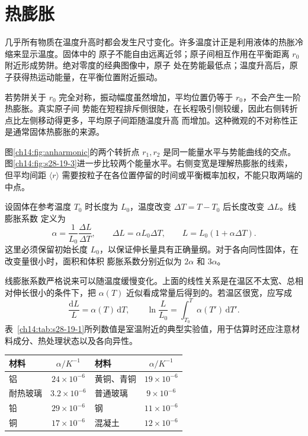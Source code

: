 {\section{热膨胀}\label{ch14:sec:expansion}

几乎所有物质在温度升高时都会发生尺寸变化。许多温度计正是利用液体的热胀冷缩来显示温度。固体中的
原子不能自由远离近邻；原子间相互作用在平衡距离 $r_0$ 附近形成势阱。绝对零度的经典图像中，原子
处在势能最低点；温度升高后，原子获得热运动能量，在平衡位置附近振动。

若势阱关于 $r_0$ 完全对称，振动幅度虽然增加，平均位置仍等于 $r_0$，不会产生一阶热膨胀。真实原子间
势能在短程排斥侧很陡，在长程吸引侧较缓，因此右侧转折点比左侧移动得更多，平均原子间距随温度升高
而增加。这种微观的不对称性正是通常固体热膨胀的来源。

图\ref{ch14:fig:anharmonic}的两个转折点 $r_1,r_2$ 是同一能量水平与势能曲线的交点。
图\ref{ch14:fig:s28-19-3}进一步比较两个能量水平。右侧变宽是理解热膨胀的线索，
但平均间距 $\langle r\rangle$ 需要按粒子在各位置停留的时间或平衡概率加权，不能只取两端的中点。
\anharmonicPotentialDiagram

\figureNineteenThreeFaithful

设固体在参考温度 $T_0$ 时长度为 $L_0$，温度改变 $\Delta T=T-T_0$ 后长度改变 $\Delta L$。线膨胀系数
定义为
\begin{equation}
  \boxed{\alpha=\frac{1}{L_0}\frac{\Delta L}{\Delta T}},
  \qquad
  \boxed{\Delta L=\alpha L_0\Delta T},
  \qquad
  \boxed{L=L_0(1+\alpha\Delta T)}.
\end{equation}
这里必须保留初始长度 $L_0$，以保证伸长量具有正确量纲。对于各向同性固体，在改变量很小时，面积和体积
膨胀系数分别近似为 $2\alpha$ 和 $3\alpha$。

线膨胀系数严格说来可以随温度缓慢变化。上面的线性关系是在温区不太宽、总相对伸长很小的条件下，把
$\alpha(T)$ 近似看成常量后得到的。若温区很宽，应写成
\begin{equation}
  \frac{\mathrm dL}{L}=\alpha(T)\,\mathrm dT,
  \qquad
  \ln\frac{L}{L_0}=\int_{T_0}^{T}\alpha(T')\,\mathrm dT'.
\end{equation}
表~\ref{ch14:tab:s28-19-1}所列数值是室温附近的典型实验值，用于估算时还应注意材料成分、热处理状态以及各向异性。

\begin{center}\begin{minipage}{\linewidth}\centering
\small
\begin{tabular}{lclc}
\toprule
材料 & $\alpha/\si{K^{-1}}$ & 材料 & $\alpha/\si{K^{-1}}$\\
\midrule
铝 & $24\times10^{-6}$ & 黄铜、青铜 & $19\times10^{-6}$\\
耐热玻璃 & $3.2\times10^{-6}$ & 普通玻璃 & $9\times10^{-6}$\\
铅 & $29\times10^{-6}$ & 钢 & $11\times10^{-6}$\\
铜 & $17\times10^{-6}$ & 混凝土 & $12\times10^{-6}$\\
\bottomrule
\end{tabular}
\label{ch14:tab:s28-19-1}
\end{minipage}\end{center}

}
